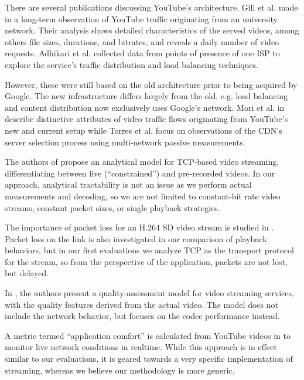 There are several publications discussing YouTube's architecture. Gill et al. made in \cite{gill2007youtube} a long-term observation of YouTube traffic originating from an university network. Their analysis shows detailed characteristics of the served videos, among others file sizes, durations, and bitrates, and reveals a daily number of video requests. Adhikari et al. \cite{adhikari2010youtube} collected data from points of presence of one ISP to explore the service's traffic distribution and load balancing techniques.

However, these were still based on the old architecture prior to being acquired by Google. The new infrastructure differs largely from the old, e.g. load balancing and content distribution now exclusively uses Google’s network. Mori et al. in \cite{mori2010characterizing} describe distinctive attributes of video traffic flows originating from YouTube's new and current setup while Torres et al. \cite{torres2011dissecting} focus on observations of the CDN's server selection process using multi-network passive measurements.


The authors of \cite{wang2003model} propose an analytical model for TCP-based video streaming, differentiating between live (``constrained'') and pre-recorded videos. In our approach, analytical tractability is not an issue as we perform actual measurements and decoding, so we are not limited to constant-bit rate video streams, constant packet sizes, or single playback strategies.

The importance of packet loss for an H.264 SD video stream is studied in \cite{pv2010loss}. Packet loss on the link is also investigated in our comparison of playback behaviors, but in our first evaluations we analyze TCP as the transport protocol for the stream, so from the perspective of the application, packets are not lost, but delayed.


In \cite{pv2010qoe}, the authors present a quality-assessment model for video streaming services, with the quality features derived from the actual video. The model does not include the network behavior, but focuses on the codec performance instead. 

A metric termed ``application comfort'' is calculated from YouTube videos in \cite{staehle2010yomo} to monitor live network conditions in realtime. While this approach is in effect similar to our evaluations, it is geared towards a very specific implementation of streaming, whereas we believe our methodology is more generic.

